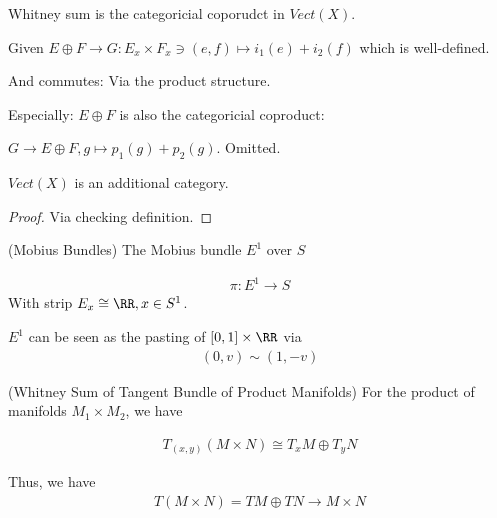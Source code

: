 \documentclass[Total.tex]{subfiles}
\begin{document}
	Whitney sum is the categoricial coporudct in $Vect(X)$. 
	\begin{center}
	\end{center}
	
	Given $E\oplus F\rightarrow G:E_x\times F_x\ni (e,f)\mapsto i_1(e)+i_2(f)$ which is well-defined. 
	
	And commutes: Via the product structure. 
	
	Especially: $E\oplus F$ is also the categoricial coproduct:
	
	\begin{center}
	\end{center}
	
	$G\rightarrow E\oplus F,g\mapsto p_1(g)+ p_2(g)$. Omitted.
	
	\begin{corollary}
		$Vect(X)$ is an additional category.
	\end{corollary}
	\begin{proof}
		Via checking definition.
	\end{proof}
	
	\begin{example}
		(Mobius Bundles) The Mobius bundle $E^1$ over $S$
		
		\begin{gather*}
			\pi:E^1\rightarrow S
		\end{gather*}
		With strip $E_x\cong \RR,x\in S^1$. 
		
		$E^1$ can be seen as the pasting of $[0,1]\times \RR$ via
		\begin{gather*}
			(0,v)\sim (1,-v)
		\end{gather*}
	\end{example}
	
	\begin{example}
		(Whitney Sum of Tangent Bundle of Product Manifolds) For the product of manifolds $M_1\times M_2$, we have
		
		\begin{gather*}
			T_{(x,y)}(M\times N)\cong T_x M\oplus T_y N
		\end{gather*}
		
		Thus, we have
		\begin{gather*}
			T(M\times N)=TM\oplus TN\rightarrow M\times N
		\end{gather*}
	\end{example}
	
\end{document}
